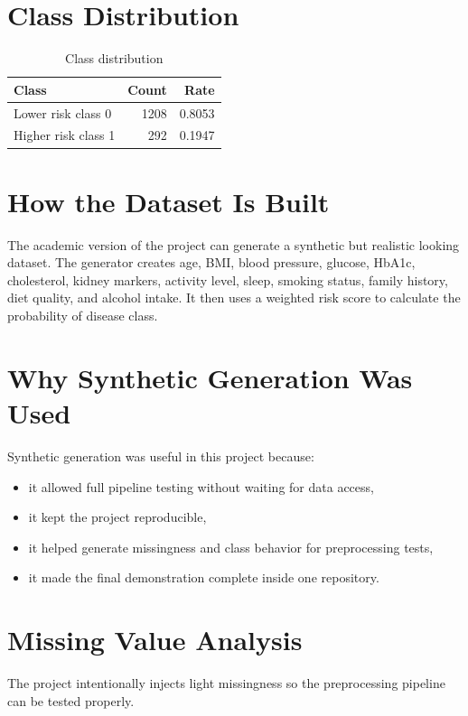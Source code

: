 \documentclass[12pt,a4paper,openany]{report}
\begin{document}
    \section{Class Distribution}
    \begin{table}[H]
    \centering
    \caption{Class distribution}
    \begin{tabular}{lrr}
    \toprule
    \textbf{Class} & \textbf{Count} & \textbf{Rate} \\
    \midrule
    Lower risk class 0 & 1208 & 0.8053 \\
    Higher risk class 1 & 292 & 0.1947 \\
    \bottomrule
    \end{tabular}
    \end{table}

    \section{How the Dataset Is Built}
    The academic version of the project can generate a synthetic but realistic looking dataset. The generator creates age, BMI, blood pressure, glucose, HbA1c, cholesterol, kidney markers, activity level, sleep, smoking status, family history, diet quality, and alcohol intake. It then uses a weighted risk score to calculate the probability of disease class.

    \section{Why Synthetic Generation Was Used}
    Synthetic generation was useful in this project because:
    \begin{itemize}[leftmargin=1.4cm]
    \item it allowed full pipeline testing without waiting for data access,
    \item it kept the project reproducible,
    \item it helped generate missingness and class behavior for preprocessing tests,
    \item it made the final demonstration complete inside one repository.
    \end{itemize}

    \section{Missing Value Analysis}
    The project intentionally injects light missingness so the preprocessing pipeline can be tested properly.
\end{document}

